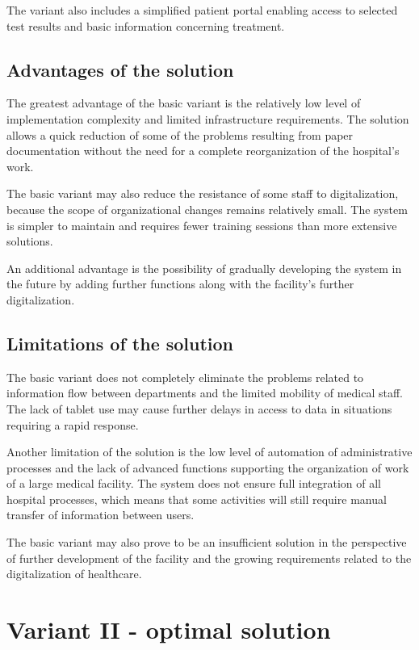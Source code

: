 The variant also includes a simplified patient portal enabling access to selected test results and basic information concerning treatment.

\subsection{Advantages of the solution}
The greatest advantage of the basic variant is the relatively low level of implementation complexity and limited infrastructure requirements. The solution allows a quick reduction of some of the problems resulting from paper documentation without the need for a complete reorganization of the hospital's work.

The basic variant may also reduce the resistance of some staff to digitalization, because the scope of organizational changes remains relatively small. The system is simpler to maintain and requires fewer training sessions than more extensive solutions.

An additional advantage is the possibility of gradually developing the system in the future by adding further functions along with the facility's further digitalization.

\subsection{Limitations of the solution}
The basic variant does not completely eliminate the problems related to information flow between departments and the limited mobility of medical staff. The lack of tablet use may cause further delays in access to data in situations requiring a rapid response.

Another limitation of the solution is the low level of automation of administrative processes and the lack of advanced functions supporting the organization of work of a large medical facility. The system does not ensure full integration of all hospital processes, which means that some activities will still require manual transfer of information between users.

The basic variant may also prove to be an insufficient solution in the perspective of further development of the facility and the growing requirements related to the digitalization of healthcare.

\section{Variant II - optimal solution}

